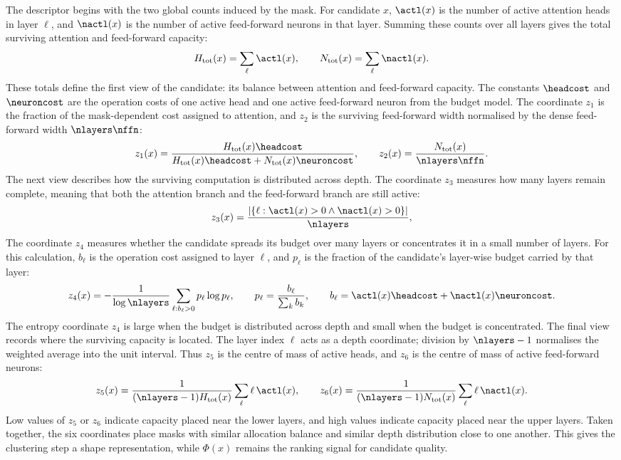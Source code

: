 The descriptor begins with the two global counts induced by the mask. For candidate $x$, $\actl(x)$ is the number of active attention heads in layer $\ell$, and $\nactl(x)$ is the number of active feed-forward neurons in that layer. Summing these counts over all layers gives the total surviving attention and feed-forward capacity:
\[
H_{\mathrm{tot}}(x)=\sum_{\ell}\actl(x),
\qquad
N_{\mathrm{tot}}(x)=\sum_{\ell}\nactl(x).
\]
These totals define the first view of the candidate: its balance between attention and feed-forward capacity. The constants $\headcost$ and $\neuroncost$ are the operation costs of one active head and one active feed-forward neuron from the budget model. The coordinate $z_1$ is the fraction of the mask-dependent cost assigned to attention, and $z_2$ is the surviving feed-forward width normalised by the dense feed-forward width $\nlayers\nffn$:
\[
z_1(x)
=
\frac{H_{\mathrm{tot}}(x)\headcost}
{H_{\mathrm{tot}}(x)\headcost+N_{\mathrm{tot}}(x)\neuroncost},
\qquad
z_2(x)
=
\frac{N_{\mathrm{tot}}(x)}{\nlayers\nffn}.
\]
The next view describes how the surviving computation is distributed across depth. The coordinate $z_3$ measures how many layers remain complete, meaning that both the attention branch and the feed-forward branch are still active:
\[
z_3(x)
=
\frac{\left|\{\ell:\actl(x)>0 \wedge \nactl(x)>0\}\right|}{\nlayers},
\]
The coordinate $z_4$ measures whether the candidate spreads its budget over many layers or concentrates it in a small number of layers. For this calculation, $b_\ell$ is the operation cost assigned to layer $\ell$, and $p_\ell$ is the fraction of the candidate's layer-wise budget carried by that layer:
\[
z_4(x)
=
-\frac{1}{\log \nlayers}
\sum_{\ell:b_\ell>0}p_\ell\log p_\ell,
\qquad
p_\ell=\frac{b_\ell}{\sum_k b_k},
\qquad
b_\ell=\actl(x)\headcost+\nactl(x)\neuroncost .
\]
The entropy coordinate $z_4$ is large when the budget is distributed across depth and small when the budget is concentrated. The final view records where the surviving capacity is located. The layer index $\ell$ acts as a depth coordinate; division by $\nlayers-1$ normalises the weighted average into the unit interval. Thus $z_5$ is the centre of mass of active heads, and $z_6$ is the centre of mass of active feed-forward neurons:
\[
z_5(x)
=
\frac{1}{(\nlayers-1)H_{\mathrm{tot}}(x)}
\sum_{\ell}\ell\,\actl(x),
\qquad
z_6(x)
=
\frac{1}{(\nlayers-1)N_{\mathrm{tot}}(x)}
\sum_{\ell}\ell\,\nactl(x).
\]
Low values of $z_5$ or $z_6$ indicate capacity placed near the lower layers, and high values indicate capacity placed near the upper layers. Taken together, the six coordinates place masks with similar allocation balance and similar depth distribution close to one another. This gives the clustering step a shape representation, while $\Phi(x)$ remains the ranking signal for candidate quality.

